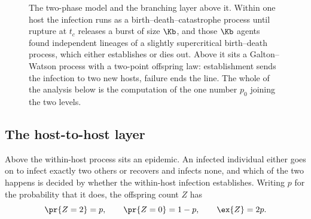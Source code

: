 \begin{figure}[!htbp]
\centering
{}
\caption{The two-phase model and the branching layer above it. Within one
host the infection runs as a birth--death--catastrophe process until rupture
at $t_c$ releases a burst of size $\Kb$, and those $\Kb$ agents found
independent lineages of a slightly supercritical birth--death process, which
either establishes or dies out. Above it sits a Galton--Watson process with a
two-point offspring law: establishment sends the infection to two new hosts,
failure ends the line. The whole of the analysis below is the computation of
the one number $p_0$ joining the two levels.}
\label{var:fig:phase-schematic}
\end{figure}

\subsection{The host-to-host layer}
\label{var:sec:hosttohost}

Above the within-host process sits an epidemic. An infected individual either
goes on to infect exactly two others or recovers and infects none, and which
of the two happens is decided by whether the within-host infection
establishes. Writing $p$ for the probability that it does, the offspring
count $Z$ has
\begin{equation}
\pr{Z=2}=p,\qquad \pr{Z=0}=1-p,\qquad \ex{Z}=2p .
\label{var:eq:offspring}
\end{equation}

